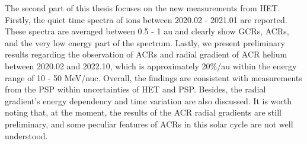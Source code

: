 The second part of this thesis focuses on the new measurements from \ac{HET}. Firstly, the quiet time spectra of ions between 2020.02 - 2021.01 are reported. These spectra are averaged between 0.5 - 1 au and clearly show \acp{GCR}, \acp{ACR}, and the very low energy part of the spectrum. Lastly, we present preliminary results regarding the observation of \acp{ACR} and radial gradient of \ac{ACR} helium between 2020.02 and 2022.10, which is approximately 20\%/au within the energy range of 10 - 50 MeV/nuc. Overall, the findings are consistent with measurements from the \ac{PSP} within uncertainties of \ac{HET} and \ac{PSP}. Besides, the radial gradient's energy dependency and time variation are also discussed. It is worth noting that, at the moment, the results of the \ac{ACR} radial gradients are still preliminary, and some peculiar features of \acp{ACR} in this solar cycle are not well understood.




